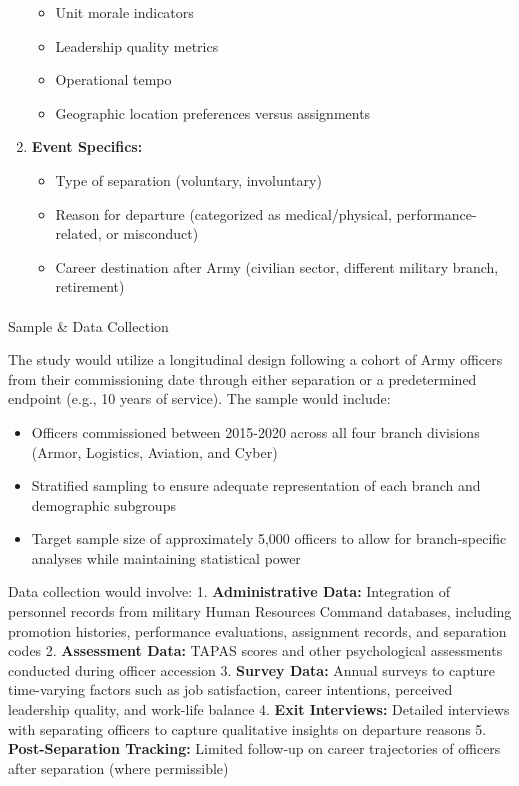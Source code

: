\documentclass[./main.tex]{subfiles}
\makeatletter
\let\oldparagraph\paragraph
\renewcommand{\paragraph}{
    \@ifstar
      \xxxParagraphStar
      \xxxParagraphNoStar
  }
\newcommand{\xxxParagraphStar}[1]{\oldparagraph*{#1}\mbox{}}
\newcommand{\xxxParagraphNoStar}[1]{\oldparagraph{#1}\mbox{}}
\providecommand{\tightlist}{%
  \setlength{\itemsep}{0pt}\setlength{\parskip}{0pt}}
\makeatother
\begin{document}
\begin{enumerate}
  \begin{itemize}
  \tightlist
  \item
    Unit morale indicators
  \item
    Leadership quality metrics
  \item
    Operational tempo
  \item
    Geographic location preferences versus assignments
  \end{itemize}
\item
  \textbf{Event Specifics:}

  \begin{itemize}
  \tightlist
  \item
    Type of separation (voluntary, involuntary)
  \item
    Reason for departure (categorized as medical/physical,
    performance-related, or misconduct)
  \item
    Career destination after Army (civilian sector, different military
    branch, retirement)
  \end{itemize}
\end{enumerate}

\paragraph{Sample \& Data Collection}\label{sample-data-collection}

The study would utilize a longitudinal design following a cohort of Army
officers from their commissioning date through either separation or a
predetermined endpoint (e.g., 10 years of service). The sample would
include:

\begin{itemize}
\tightlist
\item
  Officers commissioned between 2015-2020 across all four branch
  divisions (Armor, Logistics, Aviation, and Cyber)
\item
  Stratified sampling to ensure adequate representation of each branch
  and demographic subgroups
\item
  Target sample size of approximately 5,000 officers to allow for
  branch-specific analyses while maintaining statistical power
\end{itemize}

Data collection would involve: 1. \textbf{Administrative Data:}
Integration of personnel records from military Human Resources Command
databases, including promotion histories, performance evaluations,
assignment records, and separation codes 2. \textbf{Assessment Data:}
TAPAS scores and other psychological assessments conducted during
officer accession 3. \textbf{Survey Data:} Annual surveys to capture
time-varying factors such as job satisfaction, career intentions,
perceived leadership quality, and work-life balance 4. \textbf{Exit
Interviews:} Detailed interviews with separating officers to capture
qualitative insights on departure reasons 5. \textbf{Post-Separation
Tracking:} Limited follow-up on career trajectories of officers after
separation (where permissible)
\end{document}
